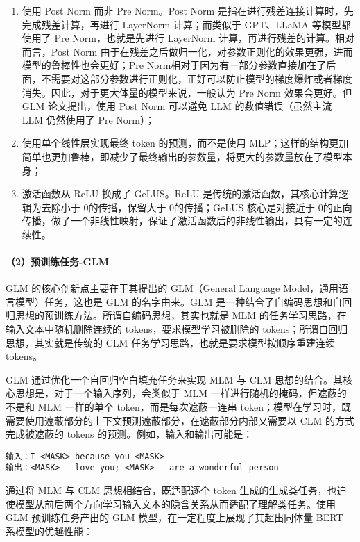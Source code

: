 \documentclass[
]{article}
\begin{document}
\begin{enumerate}
\def\labelenumi{\arabic{enumi}.}
\item
  使用 Post Norm 而非 Pre Norm。Post Norm
  是指在进行残差连接计算时，先完成残差计算，再进行 LayerNorm
  计算；而类似于 GPT、LLaMA 等模型都使用了 Pre Norm，也就是先进行
  LayerNorm 计算，再进行残差的计算。相对而言，Post Norm
  由于在残差之后做归一化，对参数正则化的效果更强，进而模型的鲁棒性也会更好；Pre
  Norm相对于因为有一部分参数直接加在了后面，不需要对这部分参数进行正则化，正好可以防止模型的梯度爆炸或者梯度消失。因此，对于更大体量的模型来说，一般认为
  Pre Norm 效果会更好。但 GLM 论文提出，使用 Post Norm 可以避免 LLM
  的数值错误（虽然主流 LLM 仍然使用了 Pre Norm）；
\item
  使用单个线性层实现最终 token 的预测，而不是使用
  MLP；这样的结构更加简单也更加鲁棒，即减少了最终输出的参数量，将更大的参数量放在了模型本身；
\item
  激活函数从 ReLU 换成了 GeLUS。ReLU
  是传统的激活函数，其核心计算逻辑为去除小于 0的传播，保留大于
  0的传播；GeLUS 核心是对接近于
  0的正向传播，做了一个非线性映射，保证了激活函数后的非线性输出，具有一定的连续性。
\end{enumerate}

\paragraph{（2）预训练任务-GLM}\label{ux9884ux8badux7ec3ux4efbux52a1-glm}

GLM 的核心创新点主要在于其提出的 GLM（General Language
Model，通用语言模型）任务，这也是 GLM 的名字由来。GLM
是一种结合了自编码思想和自回归思想的预训练方法。所谓自编码思想，其实也就是
MLM 的任务学习思路，在输入文本中随机删除连续的
tokens，要求模型学习被删除的 tokens；所谓自回归思想，其实就是传统的 CLM
任务学习思路，也就是要求模型按顺序重建连续 tokens。

GLM 通过优化一个自回归空白填充任务来实现 MLM 与 CLM
思想的结合。其核心思想是，对于一个输入序列，会类似于 MLM
一样进行随机的掩码，但遮蔽的不是和 MLM 一样的单个
token，而是每次遮蔽一连串
token；模型在学习时，既需要使用遮蔽部分的上下文预测遮蔽部分，在遮蔽部分内部又需要以
CLM 的方式完成被遮蔽的 tokens 的预测。例如，输入和输出可能是：

\begin{verbatim}
输入：I <MASK> because you <MASK>
输出：<MASK> - love you; <MASK> - are a wonderful person
\end{verbatim}

通过将 MLM 与 CLM 思想相结合，既适配逐个 token
生成的生成类任务，也迫使模型从前后两个方向学习输入文本的隐含关系从而适配了理解类任务。使用
GLM 预训练任务产出的 GLM 模型，在一定程度上展现了其超出同体量 BERT
系模型的优越性能：
\end{document}
